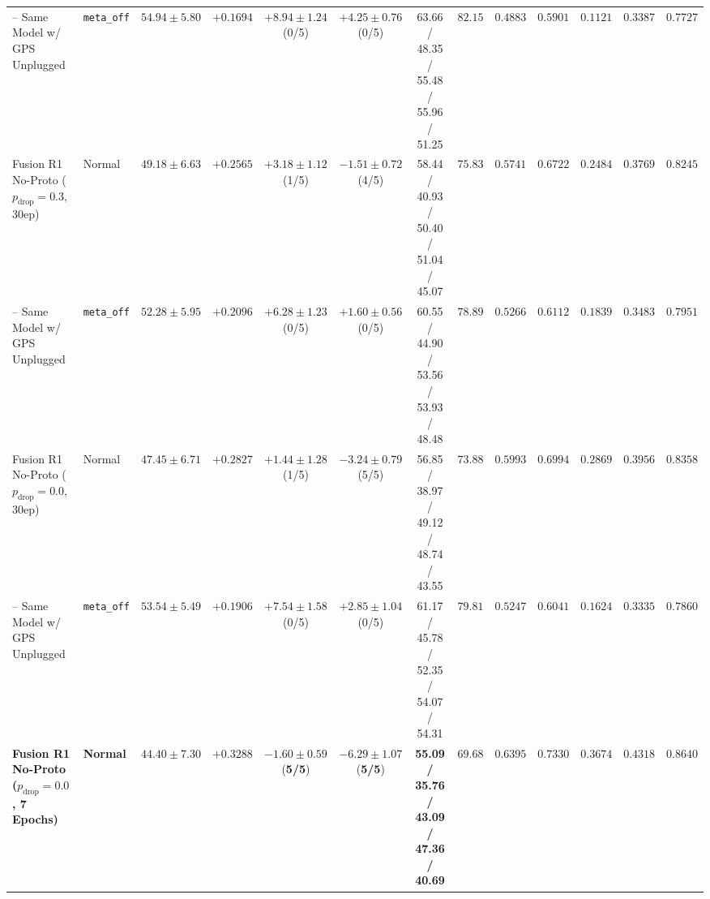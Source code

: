 \documentclass[conference]{IEEEtran}
\begin{document}
\begin{table}[t]
{\begin{tabular}{llccccccccccc}
      \quad -- Same Model w/ GPS Unplugged                            & \texttt{meta\_off}  &     $54.94 \pm 5.80$      &     $+0.1694$      &          $+8.94 \pm 1.24$ (0/5)          &          $+4.25 \pm 0.76$ (0/5)          &     63.66 / 48.35 / 55.48 / 55.96 / 51.25      &     $82.15$      &     $0.4883$      &     $0.5901$      &      $0.1121$      &     $0.3387$      &             $0.7727$             \\
      Fusion R1 No-Proto ($p_{\text{drop}} = 0.3$, 30ep)              & Normal              &     $49.18 \pm 6.63$      &     $+0.2565$      &          $+3.18 \pm 1.12$ (1/5)          &          $-1.51 \pm 0.72$ (4/5)          &     58.44 / 40.93 / 50.40 / 51.04 / 45.07      &     $75.83$      &     $0.5741$      &     $0.6722$      &      $0.2484$      &     $0.3769$      &             $0.8245$             \\
      \quad -- Same Model w/ GPS Unplugged                            & \texttt{meta\_off}  &     $52.28 \pm 5.95$      &     $+0.2096$      &          $+6.28 \pm 1.23$ (0/5)          &          $+1.60 \pm 0.56$ (0/5)          &     60.55 / 44.90 / 53.56 / 53.93 / 48.48      &     $78.89$      &     $0.5266$      &     $0.6112$      &      $0.1839$      &     $0.3483$      &             $0.7951$             \\
      Fusion R1 No-Proto ($p_{\text{drop}} = 0.0$, 30ep)              & Normal              &     $47.45 \pm 6.71$      &     $+0.2827$      &          $+1.44 \pm 1.28$ (1/5)          &          $-3.24 \pm 0.79$ (5/5)          &     56.85 / 38.97 / 49.12 / 48.74 / 43.55      &     $73.88$      &     $0.5993$      &     $0.6994$      &      $0.2869$      &     $0.3956$      &             $0.8358$             \\
      \quad -- Same Model w/ GPS Unplugged                            & \texttt{meta\_off}  &     $53.54 \pm 5.49$      &     $+0.1906$      &          $+7.54 \pm 1.58$ (0/5)          &          $+2.85 \pm 1.04$ (0/5)          &     61.17 / 45.78 / 52.35 / 54.07 / 54.31      &     $79.81$      &     $0.5247$      &     $0.6041$      &      $0.1624$      &     $0.3335$      &             $0.7860$             \\
      \midrule
      \textbf{Fusion R1 No-Proto ($p_{\text{drop}} = 0.0$, 7 Epochs)} & \textbf{Normal}     & $\mathbf{44.40 \pm 7.30}$ & $\mathbf{+0.3288}$ & $\mathbf{-1.60 \pm 0.59}$ (\textbf{5/5}) & $\mathbf{-6.29 \pm 1.07}$ (\textbf{5/5}) & \textbf{55.09 / 35.76 / 43.09 / 47.36 / 40.69} & $\mathbf{69.68}$ & $\mathbf{0.6395}$ & $\mathbf{0.7330}$ & $\mathbf{0.3674}$  & $\mathbf{0.4318}$ &        $\mathbf{0.8640}$         \\

\end{tabular}}
\end{table}
\end{document}
